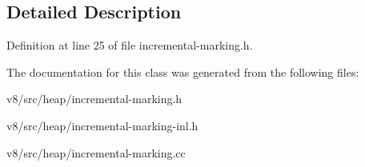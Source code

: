 \subsection{Detailed Description}


Definition at line 25 of file incremental-\/marking.\+h.



The documentation for this class was generated from the following files\+:\begin{DoxyCompactItemize}
\item 
v8/src/heap/incremental-\/marking.\+h\item 
v8/src/heap/incremental-\/marking-\/inl.\+h\item 
v8/src/heap/incremental-\/marking.\+cc\end{DoxyCompactItemize}
